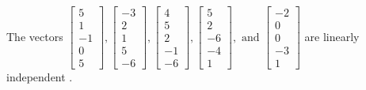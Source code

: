 \begin{exercise}
\begin{exerciseStatement}
  \end{exerciseStatement}
  \begin{exerciseAnswer}
   The vectors \(\left[\begin{array}{r}
5 \\
1 \\
-1 \\
0 \\
5
\end{array}\right] , \left[\begin{array}{r}
-3 \\
2 \\
1 \\
5 \\
-6
\end{array}\right] , \left[\begin{array}{r}
4 \\
5 \\
2 \\
-1 \\
-6
\end{array}\right] , \left[\begin{array}{r}
5 \\
2 \\
-6 \\
-4 \\
1
\end{array}\right] , \text{ and } \left[\begin{array}{r}
-2 \\
0 \\
0 \\
-3 \\
1
\end{array}\right]\) are 
  	 linearly independent  .
  


  \end{exerciseAnswer}
\end{exercise}